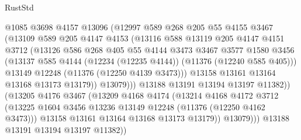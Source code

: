 \begin{lexlean}{RustStd}
\begin{coremodule}
{\begin{coremodule}
{{{{{{{{{{{{{{{{{{{{{{{{{{{{{{{{{{{{{{{{{{{{{{{{{{{{{{{{{{{{{{{{{{{{{{{{{{{{{{{{{{{{{                        @1085
                        @3698
                        @4157
                        @13096
                        (@12997
                          @589
                          @268
                          @205
                          @55
                          @4155
                          @3467
                          (@13109
                            @589
                            @205
                            @4147
                            @4153
                            (@13116
                              @588
                              @13119
                              @205
                              @4147
                              @4151
                              @3712
                              (@13126
                                @586
                                @268
                                @405
                                @55
                                @4144
                                @3473
                                @3467
                                @3577
                                @1580
                                @3456
                                (@13137
                                  @585
                                  @4144
                                  (@12234 (@12235 @4144))
                                  (@11376 (@12240 @585 @405)))
                                @13149
                                @12248
                                (@11376 (@12250 @4139 @3473)))
                              @13158
                              @13161
                              @13164
                              @13168
                              @13173
                              @13179))
                          @13079)))
                    @13188
                    @13191
                    @13194
                    @13197
                    @11382))
                (@13205
                  @4176
                  @3467
                  (@13209
                    @4168
                    @4174
                    (@13214
                      @4168
                      @4172
                      @3712
                      (@13225 @1604 @3456 @13236 @13149 @12248 (@11376 (@12250 @4162 @3473)))
                      @13158
                      @13161
                      @13164
                      @13168
                      @13173
                      @13179))
                  @13079)))
            @13188
            @13191
            @13194
            @13197
            @11382))
}}}}}}}}}}}}}}}}}}}}}}}}}}}}}}}}}}}}}}}}}}}}}}}}}}}}}}}}}}}}}}}}}}}}}}}}}}}}}}}}}}}}}
\end{coremodule}}
\end{coremodule}
\end{lexlean}
